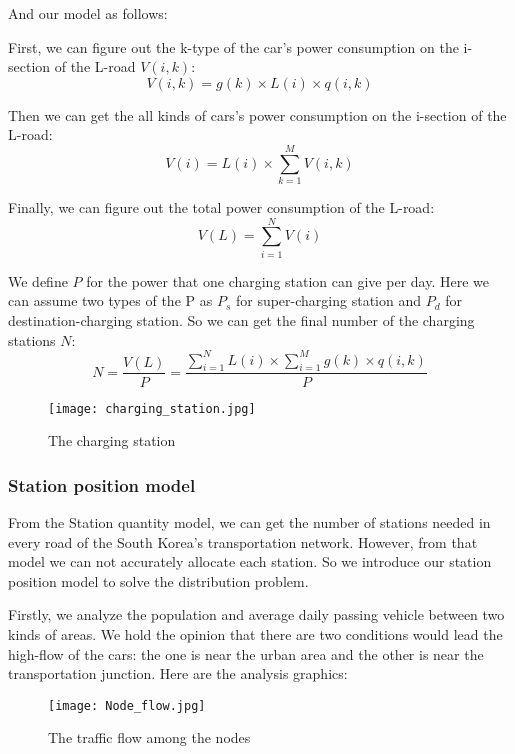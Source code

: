 \documentclass[12pt]{article}  %
\begin{document}
And our model as follows:

First, we can figure out the k-type of the car's power consumption on the i-section of the L-road $V(i,k)$:
\begin{equation}
V(i,k) = g(k) \times L(i) \times q(i,k)
\end{equation}

Then we can get the all kinds of cars's power consumption on the i-section of the L-road:
\begin{equation}
V(i) = L(i) \times \sum\limits_{k = 1}^M {V(i,k)}
\end{equation}

Finally, we can figure out the total power consumption of the L-road:
\begin{equation}
V(L) = \sum\limits_{i = 1}^N {V(i)}
\end{equation}

We define $P$ for the power that one charging station can give per day. Here we can assume two types of the P as $P_s$ for super-charging station and $P_d$ for destination-charging station. So we can get the final number of the charging stations $N$:
\begin{equation}
N = \frac{{V(L)}}{P} = \frac{{\sum\limits_{i = 1}^N {L(i) \times \sum\limits_{i = 1}^M {g(k) \times q(i,k)} } }}{P}
\end{equation}

\begin{figure}[H]
	\centering
	\texttt{[image: charging\_station.jpg]}
	\caption{The charging station}\label{fig:5}
\end{figure}

\subsubsection{Station position model}
From the Station quantity model, we can get the number of stations needed in every road of the South Korea's transportation network. However, from that model we can not accurately allocate each station. So we introduce our station position model to solve the distribution problem. 

Firstly, we analyze the population and average daily passing vehicle between two kinds of areas. We hold the opinion that there are two conditions would lead the high-flow of the cars: the one is near the urban area and the other is near the transportation junction. Here are the analysis graphics:

\begin{figure}[H]
	\centering
	\texttt{[image: Node\_flow.jpg]}
	\caption{The traffic flow among the nodes}\label{fig:6}
\end{figure}
\end{document}
